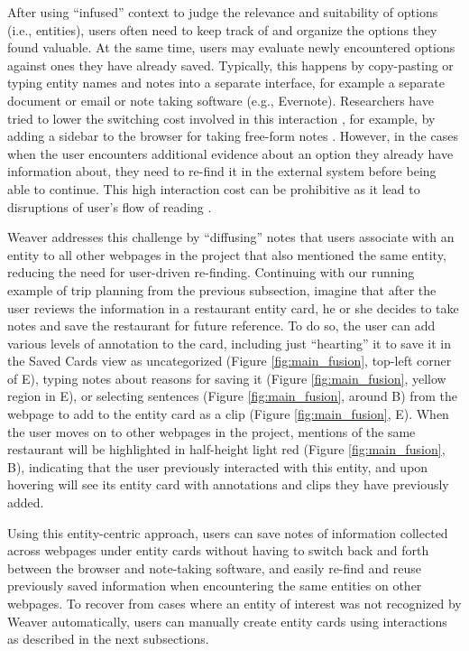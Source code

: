After using ``infused'' context to judge the relevance and suitability of options (i.e., entities), users often need to keep track of and organize the options they found valuable. At the same time, users may evaluate newly encountered options against ones they have already saved. Typically, this happens by copy-pasting or typing entity names and notes into a separate interface, for example a separate document or email or note taking software (e.g., Evernote). Researchers have tried to lower the switching cost involved in this interaction \cite{o1996towards,tashman2011liquidtext}, for example, by adding a sidebar to the browser for taking free-form notes \cite{notetoself}. However, in the cases when the user encounters additional evidence about an option they already have information about, they need to re-find it in the external system before being able to continue. This high interaction cost can be prohibitive as it lead to disruptions of user's flow of reading \cite{chang2016supporting,tashman2011liquidtext,o1996towards,marshall1999introducing}.

Weaver addresses this challenge by ``diffusing'' notes that users associate with an entity to all other webpages in the project that also mentioned the same entity, reducing the need for user-driven re-finding. Continuing with our running example of trip planning from the previous subsection, imagine that after the user reviews the information in a restaurant entity card, he or she decides to take notes and save the restaurant for future reference. To do so, the user can add various levels of annotation to the card, including just ``hearting'' it to save it in the Saved Cards view as uncategorized  (Figure \ref{fig:main_fusion}, top-left corner of E), typing notes about reasons for saving it (Figure \ref{fig:main_fusion}, yellow region in E), or selecting sentences (Figure \ref{fig:main_fusion}, around B) from the webpage to add to the entity card as a clip (Figure \ref{fig:main_fusion}, E). When the user moves on to other webpages in the project, mentions of the same restaurant will be highlighted in half-height light red (Figure \ref{fig:main_fusion}, B), indicating that the user previously interacted with this entity, and upon hovering will see its entity card with annotations and clips they have previously added. 


Using this entity-centric approach, users can save notes of information collected across webpages under entity cards without having to switch back and forth between the browser and note-taking software, and easily re-find and reuse previously saved information when encountering the same entities on other webpages. To recover from cases where an entity of interest was not recognized by Weaver automatically, users can manually create entity cards using interactions as described in the next subsections.



